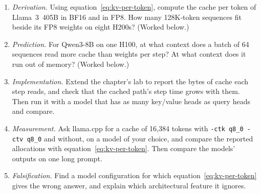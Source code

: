 \ExercisesSection

\begin{enumerate}
\item \emph{Derivation.} Using equation~\eqref{eq:kv-per-token}, compute the
cache per token of Llama~3~405B in BF16 and in FP8. How many 128K-token
sequences fit beside its FP8 weights on eight H200s? (Worked below.)
\item \emph{Prediction.} For Qwen3-8B on one H100, at what context does a
batch of 64 sequences read more cache than weights per step? At what context
does it run out of memory? (Worked below.)
\item \emph{Implementation.} Extend the chapter's lab to report the bytes of
cache each step reads, and check that the cached path's step time grows with
them. Then run it with a model that has as many key/value heads as query heads
and compare.
\item \emph{Measurement.} Ask llama.cpp for a cache of 16,384 tokens with
\texttt{-ctk q8\_0 -ctv q8\_0} and without, on a model of your choice, and
compare the reported allocations with equation~\eqref{eq:kv-per-token}. Then
compare the models' outputs on one long prompt.
\item \emph{Falsification.} Find a model configuration for which
equation~\eqref{eq:kv-per-token} gives the wrong answer, and explain which
architectural feature it ignores.
\end{enumerate}


